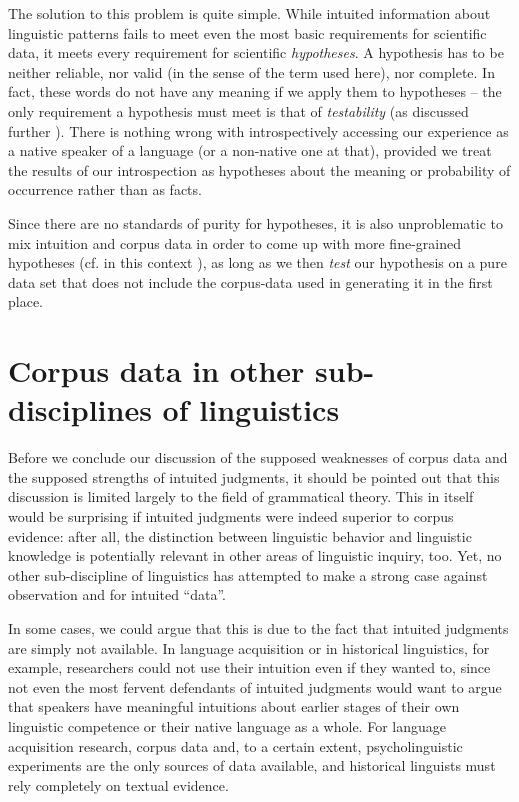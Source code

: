 The solution to this problem is quite simple. While intuited  information about linguistic patterns fails to meet even the most basic requirements for scientific data, it meets every requirement for scientific \emph{hypotheses}.  A hypothesis has to be neither reliable,  nor valid  (in the sense of the term used here), nor complete. In fact, these words do not have any meaning  if we apply them to hypotheses -- the only requirement a hypothesis must meet is that of \emph{testability} (as discussed further ). There is nothing wrong with introspectively  accessing our experience as a native speaker of a language (or a non\hyp{}native one at that), provided we treat the results of our introspection as hypotheses about the meaning or probability  of occurrence rather than as facts.

Since there are no standards of purity for hypotheses,  it is also unproblematic to mix intuition  and corpus data in order to come up with more fine\hyp{}grained hypotheses (cf. in this context \citealt[143]{aston_bnc_1998}), as long as we then \emph{test} our hypothesis on a pure data set that does not include the corpus\hyp{}data used in generating it in the first place.

\section{Corpus data in other sub\hyp{}disciplines of linguistics}
\label{sec:corpusdatainothersubdisciplines}

Before we conclude our discussion of the supposed weaknesses of corpus data and the supposed strengths of intuited  judgments, it should be pointed out that this discussion is limited largely to the field of grammatical theory. This in itself would be surprising if intuited judgments were indeed superior to corpus evidence: after all, the distinction between linguistic behavior and linguistic knowledge is potentially relevant in other areas of linguistic inquiry, too. Yet, no other sub\hyp{}discipline of linguistics has attempted to make a strong case against observation  and for intuited  ``data''.

In some cases, we could argue that this is due to the fact that intuited judgments are simply not available. In language acquisition  or in historical linguistics, for example, researchers could not use their intuition  even if they wanted to, since not even the most fervent defendants of intuited judgments would want to argue that speakers have meaningful  intuitions about earlier stages of their own linguistic competence  or their native language as a whole. For language acquisition research, corpus data and, to a certain extent, psycholinguistic  experiments  are the only sources of data available, and historical linguists must rely completely on textual evidence.

